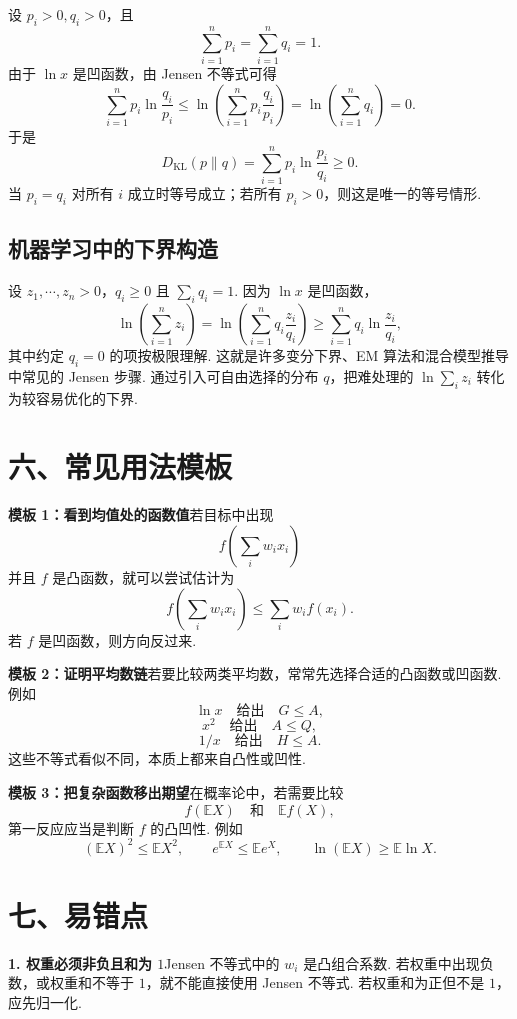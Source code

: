 \documentclass[UTF8, 12pt, fontset=fandol, oneside]{ctexart}
\begin{document}
设 $p_i>0,q_i>0$，且
\[
  \sum_{i=1}^n p_i=\sum_{i=1}^n q_i=1.
\]
由于 $\ln x$ 是凹函数，由 Jensen 不等式可得
\[
  \sum_{i=1}^n p_i\ln\frac{q_i}{p_i}
  \le
  \ln\left(\sum_{i=1}^n p_i\frac{q_i}{p_i}\right)
  =
  \ln\left(\sum_{i=1}^n q_i\right)
  =0.
\]
于是
\[
  D_{\mathrm{KL}}(p\|q)
  =
  \sum_{i=1}^n p_i\ln\frac{p_i}{q_i}
  \ge0.
\]
当 $p_i=q_i$ 对所有 $i$ 成立时等号成立；若所有 $p_i>0$，则这是唯一的等号情形.

\subsection*{机器学习中的下界构造}

设 $z_1,\cdots,z_n>0$，$q_i\ge0$ 且 $\sum_iq_i=1$. 因为 $\ln x$ 是凹函数，
\[
  \ln\left(\sum_{i=1}^n z_i\right)
  =
  \ln\left(\sum_{i=1}^n q_i\frac{z_i}{q_i}\right)
  \ge
  \sum_{i=1}^n q_i\ln\frac{z_i}{q_i},
\]
其中约定 $q_i=0$ 的项按极限理解. 这就是许多变分下界、EM 算法和混合模型推导中常见的 Jensen 步骤. 通过引入可自由选择的分布 $q$，把难处理的 $\ln\sum_i z_i$ 转化为较容易优化的下界.

\section*{六、常见用法模板}

\noindent\textbf{模板 1：看到均值处的函数值}\quad 若目标中出现
\[
  f\left(\sum_iw_ix_i\right)
\]
并且 $f$ 是凸函数，就可以尝试估计为
\[
  f\left(\sum_iw_ix_i\right)\le\sum_iw_if(x_i).
\]
若 $f$ 是凹函数，则方向反过来.

\noindent\textbf{模板 2：证明平均数链}\quad 若要比较两类平均数，常常先选择合适的凸函数或凹函数. 例如
\[
  \ln x\quad\text{给出}\quad G\le A,
\]
\[
  x^2\quad\text{给出}\quad A\le Q,
\]
\[
  1/x\quad\text{给出}\quad H\le A.
\]
这些不等式看似不同，本质上都来自凸性或凹性.

\noindent\textbf{模板 3：把复杂函数移出期望}\quad 在概率论中，若需要比较
\[
  f(\mathbb EX)\quad\text{和}\quad \mathbb E f(X),
\]
第一反应应当是判断 $f$ 的凸凹性. 例如
\[
  (\mathbb EX)^2\le\mathbb EX^2,\qquad
  e^{\mathbb EX}\le\mathbb Ee^X,\qquad
  \ln(\mathbb EX)\ge\mathbb E\ln X.
\]

\section*{七、易错点}

\noindent\textbf{1. 权重必须非负且和为 $1$}\quad Jensen 不等式中的 $w_i$ 是凸组合系数. 若权重中出现负数，或权重和不等于 $1$，就不能直接使用 Jensen 不等式. 若权重和为正但不是 $1$，应先归一化.
\end{document}
